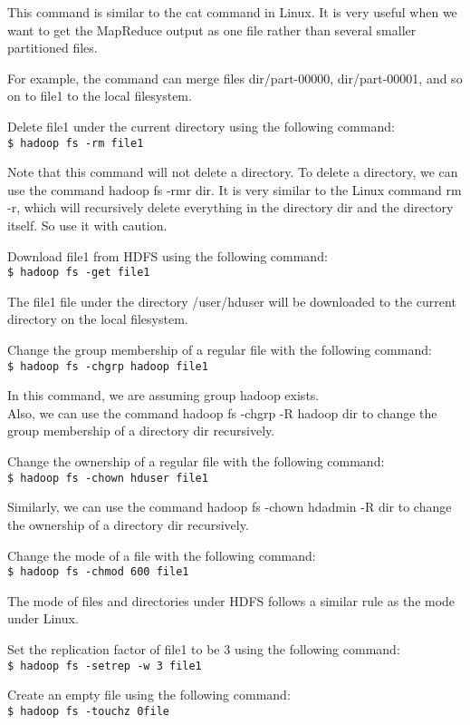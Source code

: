 This command is similar to the cat command in Linux. It is very useful when we want to get the MapReduce output as one file rather than several smaller partitioned files.

For example, the command can merge files dir/part-00000, dir/part-00001, and so on to file1 to the local filesystem.

Delete file1 under the current directory using the following command:\\
\verb|$ hadoop fs -rm file1|

Note that this command will not delete a directory. To delete a directory, we can use the command hadoop fs -rmr dir. It is very similar to the Linux command rm -r, which will recursively delete everything in the directory dir and the directory itself. So use it with caution.

Download file1 from HDFS using the following command: \\
\verb|$ hadoop fs -get file1|

The file1 file under the directory /user/hduser will be downloaded to the current directory on the local filesystem.

Change the group membership of a regular file with the following command: \\
\verb|$ hadoop fs -chgrp hadoop file1|

In this command, we are assuming group hadoop exists. \\
Also, we can use the command hadoop fs -chgrp -R hadoop dir to change the group membership of a directory dir recursively.

Change the ownership of a regular file with the following command: \\
\verb|$ hadoop fs -chown hduser file1|

Similarly, we can use the command hadoop fs -chown hdadmin -R dir to change the ownership of a directory dir recursively.

Change the mode of a file with the following command: \\
\verb|$ hadoop fs -chmod 600 file1|

The mode of files and directories under HDFS follows a similar rule as the mode under Linux.

Set the replication factor of file1 to be 3 using the following command:\\
\verb|$ hadoop fs -setrep -w 3 file1|

Create an empty file using the following command: \\
\verb|$ hadoop fs -touchz 0file|

